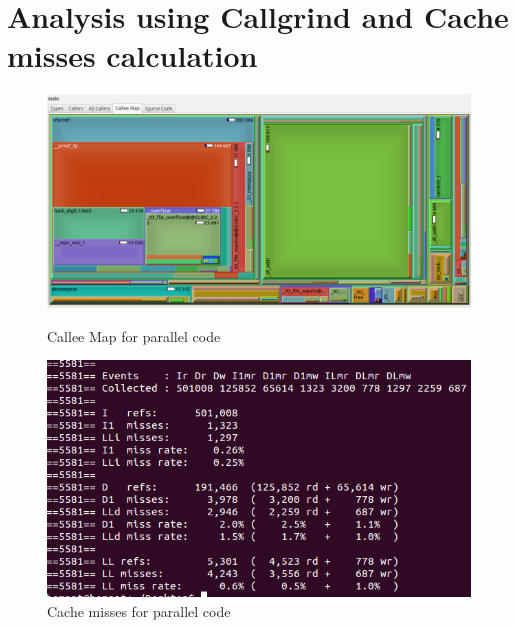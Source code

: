 \documentclass{sem5}
\begin{document}
\section{Analysis using Callgrind and Cache misses calculation}
\begin{figure}[!htp]
\centering
\includegraphics[scale=.28]{call.png}
\caption{Callee Map for parallel code}
\includegraphics[scale=.3]{cache.png}
\caption{Cache misses for parallel code}
\end{figure}
\end{document}
